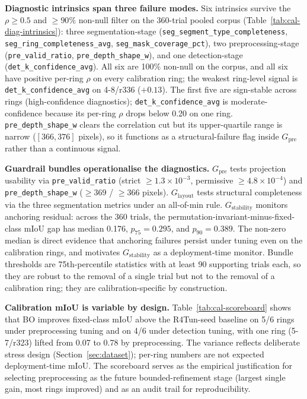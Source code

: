 \documentclass[a4paper,fleqn]{cas-dc}
\begin{document}
\textbf{Diagnostic intrinsics span three failure modes.} Six intrinsics survive the $\rho \geq 0.5$ and $\geq 90\%$ non-null filter on the 360-trial pooled corpus (Table~\ref{tab:cal-diag-intrinsics}): three segmentation-stage (\texttt{seg\_segment\_type\_completeness}, \texttt{seg\_ring\_completeness\_avg}, \texttt{seg\_mask\_coverage\_pct}), two preprocessing-stage (\texttt{pre\_valid\_ratio}, \texttt{pre\_depth\_shape\_w}), and one detection-stage (\texttt{det\_k\_confidence\_avg}). All six are 100\% non-null on the corpus, and all six have positive per-ring $\rho$ on every calibration ring; the weakest ring-level signal is \texttt{det\_k\_confidence\_avg} on 4-8/r336 ($+0.13$). The first five are sign-stable across rings (high-confidence diagnostics); \texttt{det\_k\_confidence\_avg} is moderate-confidence because its per-ring $\rho$ drops below 0.20 on one ring. \texttt{pre\_depth\_shape\_w} clears the correlation cut but its upper-quartile range is narrow ($[366, 376]$ pixels), so it functions as a structural-failure flag inside $G_{\mathrm{pre}}$ rather than a continuous signal.

\textbf{Guardrail bundles operationalise the diagnostics.} $G_{\mathrm{pre}}$ tests projection usability via \texttt{pre\_valid\_ratio} (strict $\geq 1.3\!\times\!10^{-3}$, permissive $\geq 4.8\!\times\!10^{-4}$) and \texttt{pre\_depth\_shape\_w} ($\geq 369$ / $\geq 366$ pixels). $G_{\mathrm{layout}}$ tests structural completeness via the three segmentation metrics under an all-of-min rule. $G_{\mathrm{stability}}$ monitors anchoring residual: across the 360 trials, the permutation-invariant-minus-fixed-class mIoU gap has median 0.176, $p_{75}=0.295$, and $p_{90}=0.389$. The non-zero median is direct evidence that anchoring failures persist under tuning even on the calibration rings, and motivates $G_{\mathrm{stability}}$ as a deployment-time monitor. Bundle thresholds are 75th-percentile statistics with at least 90 supporting trials each, so they are robust to the removal of a single trial but not to the removal of a calibration ring; they are calibration-specific by construction.

\textbf{Calibration mIoU is variable by design.} Table~\ref{tab:cal-scoreboard} shows that BO improves fixed-class mIoU above the R4Tun-seed baseline on 5/6 rings under preprocessing tuning and on 4/6 under detection tuning, with one ring (5-7/r323) lifted from 0.07 to 0.78 by preprocessing. The variance reflects deliberate stress design (Section~\ref{sec:dataset}); per-ring numbers are not expected deployment-time mIoU. The scoreboard serves as the empirical justification for selecting preprocessing as the future bounded-refinement stage (largest single gain, most rings improved) and as an audit trail for reproducibility.
\end{document}
